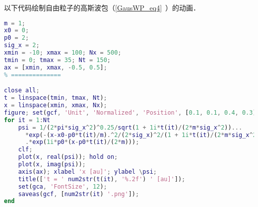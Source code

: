 

以下代码绘制自由粒子的高斯波包（\autoref{GausWP_eq4}~）的动画．

\begin{lstlisting}[language=matlab]
% === 参数 (原子单位) ===
m = 1;
x0 = 0;
p0 = 2;
sig_x = 2;
xmin = -10; xmax = 100; Nx = 500;
tmin = 0; tmax = 35; Nt = 150;
ax = [xmin, xmax, -0.5, 0.5];
% ==============

close all;
t = linspace(tmin, tmax, Nt);
x = linspace(xmin, xmax, Nx);
figure; set(gcf, 'Unit', 'Normalized', 'Position', [0.1, 0.1, 0.4, 0.3]);
for it = 1:Nt
    psi = 1/(2*pi*sig_x^2)^0.25/sqrt(1 + 1i*t(it)/(2*m*sig_x^2))...
      *exp(-(x-x0-p0*t(it)/m).^2/(2*sig_x)^2/(1 + 1i*t(it)/(2*m*sig_x^2)))...
      .*exp(1i*p0*(x-p0*t(it)/(2*m)));
    clf;
    plot(x, real(psi)); hold on;
    plot(x, imag(psi));
    axis(ax); xlabel 'x [au]'; ylabel \psi;
    title(['t = ' num2str(t(it), '%.2f') ' [au]']);
    set(gca, 'FontSize', 12);
    saveas(gcf, [num2str(it) '.png']);
end
\end{lstlisting}

